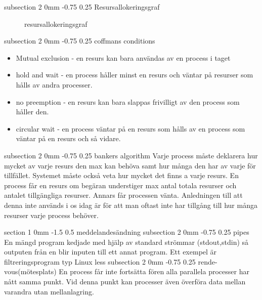 \documentclass[a4paper,11pt]{article}
\makeatletter
\renewcommand{\section}{\@startsection
   {section}%
   {1}%
   {0mm}%
   {-1.5\baselineskip}%
   {0.5\baselineskip}%
   {\sffamily\bfseries\upshape\normalsize}}%
\renewcommand{\subsection}{\@startsection
   {subsection}%
   {2}%
   {0mm}%
   {-0.75\baselineskip}%
   {0.25\baselineskip}%
   {\rmfamily\normalfont\slshape\normalsize}}%
\makeatother
\begin{document}
\subsection{Resursallokeringsgraf}
\begin{figure}[H]
\scalebox{0.8}{}
\caption{resursallokeringsgraf} 
\end{figure}
\subsection{coffmans conditions}
\begin{itemize}
\item Mutual exclusion - en resurs kan bara användas av en process i taget
\item hold and wait - en process håller minst en resurs och väntar på resurser som hålls av andra processer.
\item no preemption - en resurs kan bara slappas frivilligt av den process som håller den.
\item circular wait - en process väntar på en resurs som hålls av en process som väntar på en resurs och så vidare.
\end{itemize}
\subsection{bankers algorithm}
Varje process måste deklarera hur mycket av varje resurs den max kan behöva samt hur många den har av varje för tillfället. Systemet måste också veta hur mycket det finns a varje resurs. En
 process får en resurs om begäran understiger max antal totala resurser och antalet tillgängliga resurser. Annars får processen vänta. Anledningen till att denna inte används i os idag är för att man oftast inte har tillgång till hur många resurser varje process behöver.

\section{meddelandesändning}
\subsection{pipes}
En mängd program kedjade med hjälp av standard strömmar (stdout,stdin) så outputen från en blir
inputen till ett annat program. Ett exempel är filtreringsprogram typ Linux less
\subsection{rende-vous(mötesplats)}
En process får inte fortsätta fören alla parallela processer har nått samma punkt. Vid denna punkt kan processer även överföra data mellan varandra utan mellanlagring.
\end{document}
